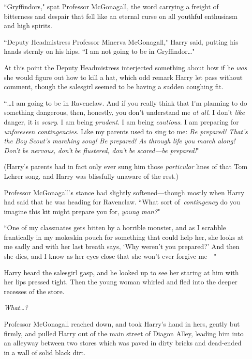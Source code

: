 ``Gryffindors," spat Professor McGonagall, the word carrying a freight of bitterness and despair that fell like an eternal curse on all youthful enthusiasm and high spirits.

``Deputy Headmistress Professor Minerva McGonagall," Harry said, putting his hands sternly on his hips. ``I am not going to be in Gryffindor{\ldots}"

At this point the Deputy Headmistress interjected something about how if he \emph{was} she would figure out how to kill a hat, which odd remark Harry let pass without comment, though the salesgirl seemed to be having a sudden coughing fit.

``{\ldots}I am going to be in Ravenclaw. And if you really think that I'm planning to do something dangerous, then, honestly, you don't understand me \emph{at all}. I don't \emph{like} danger, it is \emph{scary}. I am being \emph{prudent}. I am being \emph{cautious}. I am preparing for \emph{unforeseen contingencies}. Like my parents used to sing to me: \emph{Be prepared! That's the Boy Scout's marching song! Be prepared! As through life you march along! Don't be nervous, don't be flustered, don't be scared—be prepared!}"

(Harry's parents had in fact only ever sung him those \emph{particular} lines of that Tom Lehrer song, and Harry was blissfully unaware of the rest.)

Professor McGonagall's stance had slightly softened—though mostly when Harry had said that he was heading for Ravenclaw. ``What sort of\linebreak\ \emph{contingency} do you imagine this kit might prepare you for, \emph{young man?}"

``One of my classmates gets bitten by a horrible monster, and as I scrabble frantically in my mokeskin pouch for something that could help her, she looks at me sadly and with her last breath says, `Why weren't you prepared?' And then she dies, and I know as her eyes close that she won't ever forgive me—"

Harry heard the salesgirl gasp, and he looked up to see her staring at him with her lips pressed tight. Then the young woman whirled and fled into the deeper recesses of the store.

\emph{What{\ldots}?}

Professor McGonagall reached down, and took Harry's hand in hers, gently but firmly, and pulled Harry out of the main street of Diagon Alley, leading him into an alleyway between two stores which was paved in dirty bricks and dead-ended in a wall of solid black dirt.

